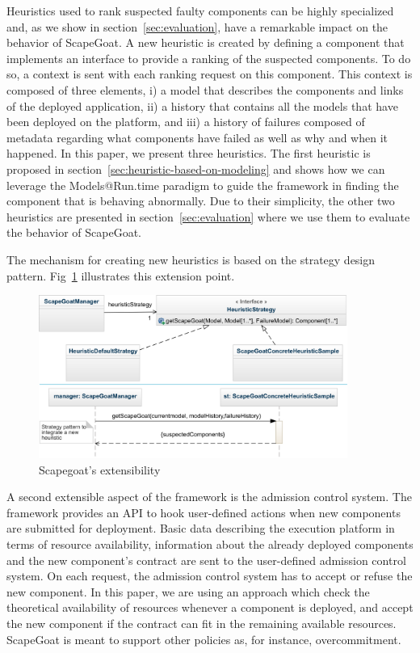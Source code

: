 Heuristics used to rank suspected faulty components can be highly specialized
and, as we show in section~\ref{sec:evaluation}, have a remarkable impact on the behavior of ScapeGoat.
A new heuristic is created by defining a component that implements an interface to provide a ranking of the suspected components.
To do so, a context is sent with each ranking request on this component.
This context is composed of three elements, 
i) a model that describes the components and links of the deployed application, 
ii) a history that contains all the models that have been deployed on the platform, and 
iii) a history of failures composed of metadata regarding what components have failed as well as why and when it happened.
In this paper, we present three heuristics.
The first heuristic is proposed in section~\ref{sec:heuristic-based-on-modeling} and shows how we can leverage the Models@Run.time paradigm to guide the framework in finding the component that is behaving abnormally.
Due to their simplicity, the other two heuristics are presented in section~\ref{sec:evaluation} where we use them to evaluate the behavior of ScapeGoat.

The mechanism for creating new heuristics is based on the strategy design pattern. Fig~\ref{fig:strategy} illustrates this extension point. 


\begin{figure}[!h]
\centering
\includegraphics[width=0.9\textwidth]{./chapter5/figures/strategy}
\caption{\label{fig:strategy}Scapegoat's extensibility}
\end{figure}



A second extensible aspect of the framework is the admission control system.
The framework provides an API to hook user-defined actions when new components are submitted for deployment.
Basic data describing the execution platform in terms of resource availability, information about the already deployed components and the new component's contract are sent to the user-defined admission control system.
On each request, the admission control system has to accept or refuse the new component.
In this paper, we are using an approach which check the theoretical availability of resources whenever a component is deployed, and accept the new component if the contract can fit in the remaining available resources.
ScapeGoat is meant to support other policies as, for instance, overcommitment.
 
